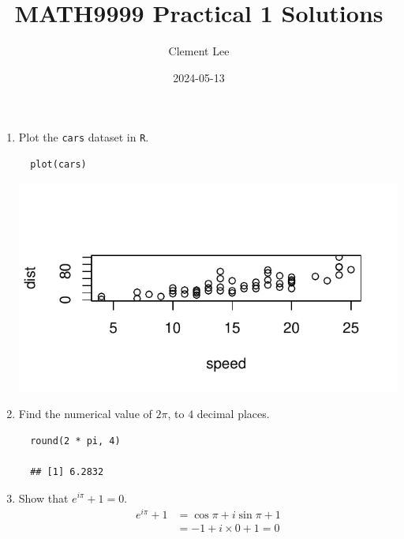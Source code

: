 \documentclass[a4paper]{article}
\title{MATH9999 Practical 1 Solutions}
\author{Clement Lee}
\date{2024-05-13}
\begin{document}
\maketitle
\noindent

\begin{enumerate}
  \item Plot the \texttt{cars} dataset in \verb^R^. 
  \begin{verbatim}
  plot(cars)
  \end{verbatim}
  \begin{center}  
  \includegraphics[width=\textwidth]{cars.pdf} 
  \end{center}

  \item Find the numerical value of $2\pi$, to $4$ decimal places.
  \begin{verbatim}
  round(2 * pi, 4)
    
  ## [1] 6.2832
  \end{verbatim}

  \item Show that $e^{i\pi}+1=0$.
  \begin{align*}
  e^{i\pi}+1&=\cos\pi+i\sin\pi+1\\
  &=-1+i\times0+1=0
  \end{align*}
  
\end{enumerate}

\end{document}
